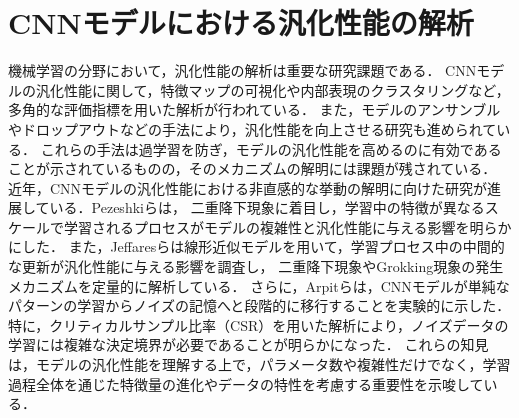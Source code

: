 \section{CNNモデルにおける汎化性能の解析}
機械学習の分野において，汎化性能の解析は重要な研究課題である．
CNNモデルの汎化性能に関して，特徴マップの可視化\cite{DBLP:conf/cvpr/ZeilerF14}や内部表現のクラスタリングなど，多角的な評価指標を用いた解析が行われている．
また，モデルのアンサンブルやドロップアウトなどの手法により，汎化性能を向上させる研究も進められている\cite{JMLR:v15:srivastava14a}．
これらの手法は過学習を防ぎ，モデルの汎化性能を高めるのに有効であることが示されているものの，そのメカニズムの解明には課題が残されている．
近年，CNNモデルの汎化性能における非直感的な挙動の解明に向けた研究が進展している．Pezeshkiら\cite{Pezeshki22}は，
二重降下現象に着目し，学習中の特徴が異なるスケールで学習されるプロセスがモデルの複雑性と汎化性能に与える影響を明らかにした．
また，Jeffaresら\cite{Jeffares2024}は線形近似モデルを用いて，学習プロセス中の中間的な更新が汎化性能に与える影響を調査し，
二重降下現象やGrokking現象の発生メカニズムを定量的に解析している．
さらに，Arpitら\cite{Arpit2017}は，CNNモデルが単純なパターンの学習からノイズの記憶へと段階的に移行することを実験的に示した．
特に，クリティカルサンプル比率（CSR）を用いた解析により，ノイズデータの学習には複雑な決定境界が必要であることが明らかになった．
これらの知見は，モデルの汎化性能を理解する上で，パラメータ数や複雑性だけでなく，学習過程全体を通じた特徴量の進化やデータの特性を考慮する重要性を示唆している．
